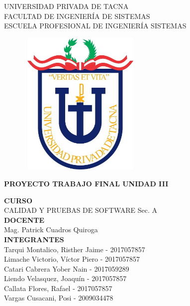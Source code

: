 \documentclass[12pt,a4paper,oneside]{book}
\begin{document}
	
	\thispagestyle{empty} 
	
	\begin{center} 
		\LARGE{UNIVERSIDAD PRIVADA DE TACNA} \\[0.5cm] 
		\Large{FACULTAD DE INGENIERÍA DE SISTEMAS}\\[0.5cm] 
		\large{ ESCUELA PROFESIONAL DE INGENIERÍA SISTEMAS} 
	\end{center}
	
	\begin{figure}[htb]
		\centering \includegraphics[width=6cm, height=7cm]{img/uptlogo.jpg}
	\end{figure}
	
	\begin{center} 
			\LARGE{\bf PROYECTO TRABAJO FINAL \newline UNIDAD III }\\ \vspace{.25cm}
		
	\end{center}

	\begin{center} 
		
		\textbf {CURSO}\\ 
		\large CALIDAD Y PRUEBAS DE SOFTWARE Sec. A \\
		
		\textbf {DOCENTE}\\
		\large Mag. Patrick Cuadros Quiroga\\
	
		\textbf {INTEGRANTES}\\
		\large Tarqui Montalico, Risther Jaime - 2017057857 \\
		\large Limache Victorio, V\'ictor Piero - 2017057857 \\
		\large Catari Cabrera Yober Nain - 2017059289 \\
		\large Liendo Velasquez, Joaqu\'in - 2017057857 \\
		\large Callata Flores, Rafael - 2017057857 \\
		\large 	Vargas Cusacani, Posi - 2009034478 \\
		
	\end{center}
\end{document}
